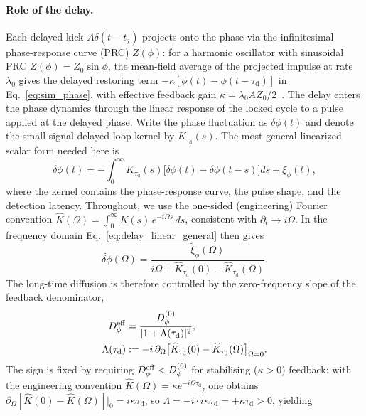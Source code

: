 \documentclass[aps,pre,reprint,amsmath,amssymb,floatfix,nofootinbib]{revtex4-2}
\newcommand{\Dphi}{D_{\phi}}
\newcommand{\taud}{\tau_{\mathrm{d}}}
\begin{document}
\paragraph*{Role of the delay.}
Each delayed kick $A\delta(t-t_j)$ projects onto the phase via the
infinitesimal phase-response curve (PRC) $Z(\phi)$: for a harmonic
oscillator with sinusoidal PRC $Z(\phi)=Z_0\sin\phi$, the mean-field
average of the projected impulse at rate $\lambda_0$ gives the delayed
restoring term $-\kappa[\phi(t)-\phi(t-\taud)]$ in
Eq.~\eqref{eq:sim_phase}, with effective feedback gain
$\kappa=\lambda_0 A Z_0/2$~\cite{Kuramoto1984,Pikovsky2001}.
The delay enters the phase dynamics through the linear response of the
locked cycle to a pulse applied at the delayed phase. Write the phase
fluctuation as $\delta\phi(t)$ and denote the small-signal delayed loop
kernel by $K_{\taud}(s)$. The most general linearized scalar form needed
here is
\begin{equation}
  \dot{\delta\phi}(t)
  =
  -\int_0^\infty K_{\taud}(s)
  \big[\delta\phi(t)-\delta\phi(t-s)\big]ds
  +\xi_\phi(t),
  \label{eq:delay_linear_general}
\end{equation}
where the kernel contains the phase-response curve, the pulse shape, and
the detection latency. Throughout, we use the one-sided (engineering)
Fourier convention $\widehat K(\Omega)=\int_0^\infty K(s)\,e^{-i\Omega s}\,ds$,
consistent with $\partial_t\to i\Omega$.
In the frequency domain Eq.~\eqref{eq:delay_linear_general} then gives
\begin{equation}
  \widetilde{\delta\phi}(\Omega)
  =
  \frac{\widetilde{\xi}_\phi(\Omega)}
  {i\Omega+\widehat K_{\taud}(0)-\widehat K_{\taud}(\Omega)} .
  \label{eq:delay_filter}
\end{equation}
The long-time diffusion is therefore controlled by the zero-frequency
slope of the feedback denominator,
\begin{align}
  \Dphi^{\rm eff}
  &=
  \frac{\Dphi^{(0)}}{|1+\Lambda(\taud)|^2},
  \label{eq:delaydiff_general}\\
  \Lambda(\taud)
  &:=-i\,\partial_\Omega
  \big[\widehat K_{\taud}(0)-\widehat K_{\taud}(\Omega)\big]_{\Omega=0}.
  \nonumber
\end{align}
The sign is fixed by requiring $D_\phi^{\rm eff}<D_\phi^{(0)}$ for
stabilising ($\kappa>0$) feedback: with the engineering convention
$\widehat K(\Omega)=\kappa e^{-i\Omega\taud}$, one obtains
$\partial_\Omega[\widehat K(0){-}\widehat K(\Omega)]|_0 = i\kappa\taud$,
so $\Lambda = -i\cdot i\kappa\taud = +\kappa\taud > 0$, yielding
\end{document}
